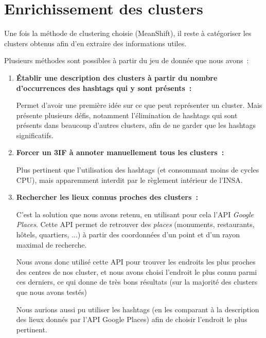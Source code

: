 \chapter{Enrichissement des clusters}

Une fois la méthode de clustering choisie (MeanShift), il reste à catégoriser les clusters obtenus afin d'en extraire des informations utiles.

Plusieurs méthodes sont possibles à partir du jeu de donnée que nous avons~:

\begin{enumerate}
    \item \textbf{Établir une description des clusters à partir du nombre d’occurrences des hashtags qui y sont présents~:}

    Permet d'avoir une première idée sur ce que peut représenter un cluster. Mais présente plusieurs défis, notamment l'élimination de hashtags
    qui sont présents dans beaucoup d'autres clusters, afin de ne garder que les hashtags significatifs.

    \item \textbf{Forcer un 3IF à annoter manuellement tous les clusters~:}

    Plus pertinent que l'utilisation des hashtags (et consommant moins de cycles CPU), mais apparemment interdit par le règlement intérieur de l'INSA.

    \item \textbf{Rechercher les lieux connus proches des clusters~:}

    C'est la solution que nous avons retenu, en utilisant pour cela l'API \textit{Google Places}.
    Cette API permet de retrouver des \textit{places} (monuments, restaurants, hôtels, quartiers, ...) à partir des coordonnées d'un point
    et d'un rayon maximal de recherche.

    Nous avons donc utilisé cette API pour trouver les endroits les plus proches des centres de nos cluster, et nous avons choisi
    l'endroit le plus connu parmi ces derniers, ce qui donne de très bons résultats (sur la majorité des clusters que nous avons testés)

    Nous aurions aussi pu utiliser les hashtags (en les comparant à la description des lieux donnés par l'API Google Places) afin de
    choisir l'endroit le plus pertinent.
\end{enumerate}
